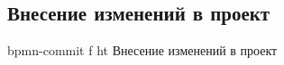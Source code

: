 \documentclass{bmstu}
\begin{document}
\subsection*{Внесение изменений в проект}
{bpmn-commit}
{f}
{ht}
{\textwidth}
{Внесение изменений в проект}
\FloatBarrier



%
%
%
\end{document}
